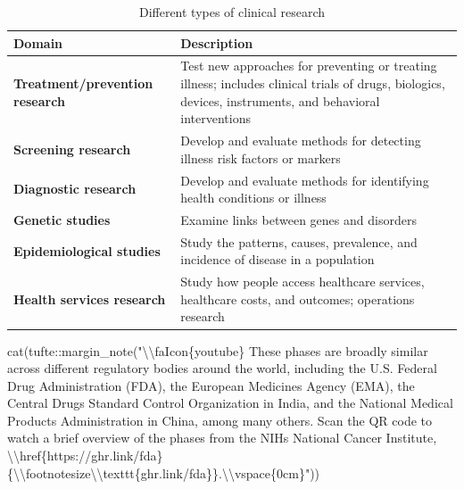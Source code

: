 \documentclass[
  letterpaper,
  DIV=11,
  numbers=noendperiod,
  oneside]{scrartcl}
\newenvironment{Shaded}{\begin{snugshade}}{\end{snugshade}}
\newcommand{\FunctionTok}[1]{\textcolor[rgb]{0.28,0.35,0.67}{#1}}
\newcommand{\NormalTok}[1]{\textcolor[rgb]{0.00,0.23,0.31}{#1}}
\newcommand{\SpecialCharTok}[1]{\textcolor[rgb]{0.37,0.37,0.37}{#1}}
\newcommand{\StringTok}[1]{\textcolor[rgb]{0.13,0.47,0.30}{#1}}
\begin{document}
\begin{table}

\caption{Different types of clinical research}
\begin{tabular}[t]{>{\raggedright\arraybackslash}p{5cm}>{\raggedright\arraybackslash}p{10.5cm}}
\toprule
\textbf{Domain} & \textbf{Description}\\
\midrule
\textbf{Treatment/prevention research} & Test new approaches for preventing or treating illness; includes clinical trials of drugs, biologics, devices, instruments, and behavioral interventions\\
\textbf{Screening research} & Develop and evaluate methods for detecting illness risk factors or markers\\
\textbf{Diagnostic research} & Develop and evaluate methods for identifying health conditions or illness\\
\textbf{Genetic studies} & Examine links between genes and disorders\\
\textbf{Epidemiological studies} & Study the patterns, causes, prevalence, and incidence of disease in a population\\
\addlinespace
\textbf{Health services research} & Study how people access healthcare services, healthcare costs, and outcomes; operations research\\
\bottomrule
\end{tabular}
\end{table}

\vspace{2em}

\newpage

\begin{Shaded}
\begin{Highlighting}[]
\FunctionTok{cat}\NormalTok{(tufte}\SpecialCharTok{::}\FunctionTok{margin\_note}\NormalTok{(}\StringTok{"}\SpecialCharTok{\textbackslash{}\textbackslash{}}\StringTok{faIcon\{youtube\} These phases are broadly similar across different regulatory bodies around the world, including the U.S. Federal Drug Administration (FDA), the European Medicines Agency (EMA), the Central Drugs Standard Control Organization in India, and the National Medical Products Administration in China, among many others. Scan the QR code to watch a brief overview of the phases from the NIH\textquotesingle{}s National Cancer Institute, }\SpecialCharTok{\textbackslash{}\textbackslash{}}\StringTok{href\{https://ghr.link/fda\}\{}\SpecialCharTok{\textbackslash{}\textbackslash{}}\StringTok{footnotesize}\SpecialCharTok{\textbackslash{}\textbackslash{}}\StringTok{texttt\{ghr.link/fda\}\}.}\SpecialCharTok{\textbackslash{}\textbackslash{}}\StringTok{vspace\{0cm\}"}\NormalTok{))}
\end{Highlighting}
\end{Shaded}
\end{document}
